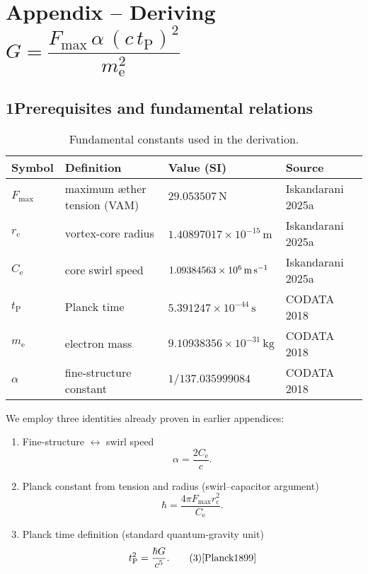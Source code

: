 \documentclass[11pt]{article}
\begin{document}
\section*{Appendix – Deriving $G = \dfrac{F_{\max}\,\alpha\,(c\,t_{\mathrm{P}})^{2}}{m_{\mathrm{e}}^{2}}$}

\subsection*{1\quad Prerequisites and fundamental relations}

\begin{table}[h]
    \centering
    \begin{tabular}{llll}
        \toprule
        \textbf{Symbol} & \textbf{Definition} & \textbf{Value (SI)} & \textbf{Source} \\
        \midrule
        $F_{\max}$ & maximum æther tension (VAM) & $29.053507\,\text{N}$ & Iskandarani 2025a~\cite{Iskandarani2025a} \\
        $r_{\mathrm{c}}$ & vortex-core radius & $1.40897017\times10^{-15}\,\text{m}$ & Iskandarani 2025a~\cite{Iskandarani2025a} \\
        $C_{\mathrm{e}}$ & core swirl speed & $1.09384563\times10^{6}\,\text{m\,s}^{-1}$ & Iskandarani 2025a~\cite{Iskandarani2025a} \\
        $t_{\mathrm{P}}$ & Planck time & $5.391247\times10^{-44}\,\text{s}$ & CODATA 2018~\cite{CODATA2018} \\
        $m_{\mathrm{e}}$ & electron mass & $9.10938356\times10^{-31}\,\text{kg}$ & CODATA 2018~\cite{CODATA2018} \\
        $\alpha$ & fine-structure constant & $1/137.035999084$ & CODATA 2018~\cite{CODATA2018} \\
        \bottomrule
    \end{tabular}
    \caption{Fundamental constants used in the derivation.}
    \label{tab:constants}
\end{table}

We employ three identities already proven in earlier appendices:

\begin{enumerate}
    \item Fine-structure $\leftrightarrow$ swirl speed
    \begin{equation}
        \alpha = \frac{2C_{\mathrm{e}}}{c}. \tag{1}
    \end{equation}

    \item Planck constant from tension and radius (swirl–capacitor argument)
    \begin{equation}
        \hbar = \frac{4\pi F_{\max} r_{\mathrm{c}}^{2}}{C_{\mathrm{e}}}. \tag{2}
    \end{equation}

    \item Planck time definition (standard quantum-gravity unit)
    \begin{equation}
        t_{\mathrm{P}}^{2}= \frac{\hbar G}{c^{5}}. \tag{3}\hfill\text{\cite{Planck1899}}
    \end{equation}
\end{enumerate}
\end{document}
